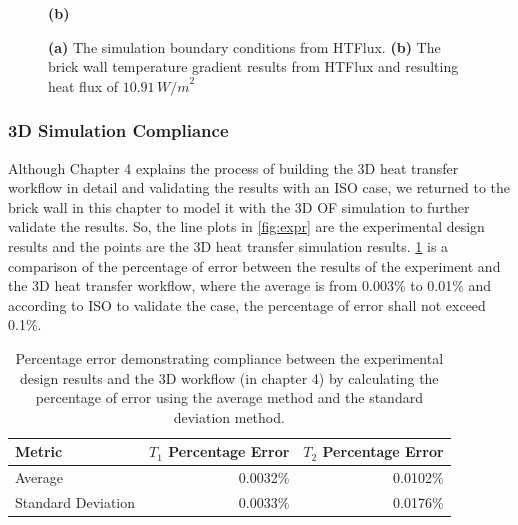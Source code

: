\begin{figure}[H]
\begin{minipage}{0.49\textwidth}
  \textbf{(b)}
\end{minipage}
\caption[2D HTFlux Boundary conditions]{\textbf{(a)} The simulation boundary conditions from HTFlux. \textbf{(b)} The brick wall temperature gradient results from HTFlux and resulting heat flux of \( 10.91 \, {W/m}^2 \) }
\label{2dconst}
\end{figure}


\subsubsection{3D Simulation Compliance}\label{3dbrick}
Although Chapter 4 explains the process of building the 3D heat transfer workflow in detail and validating the results with an ISO case, we returned to the brick wall in this chapter to model it with the 3D \gls{OF} simulation to further validate the results. So, the line plots in \ref{fig:expr} are the experimental design results and the points are the 3D heat transfer simulation results. \ref{error2d} is a comparison of the percentage of error between the results of the experiment and the 3D heat transfer workflow, where the average is from 0.003\% to 0.01\% and according to ISO\cite{ISO} to validate the case, the percentage of error shall not exceed 0.1\%.






\begin{table}[htb]
\caption[2D Results Percentage error]{Percentage error demonstrating compliance between the experimental design results and the 3D workflow (in chapter 4) by calculating the percentage of error using the average method and the standard deviation method.}
    \label{error2d}
     \centering
 \begin{tabular}{lrr}
        \toprule
        Metric & $T_1$ Percentage Error & $T_2$ Percentage Error \\
        \midrule
        Average & 0.0032\% & 0.0102\% \\
        Standard Deviation & 0.0033\% & 0.0176\% \\
        \bottomrule
    \end{tabular}
\end{table}






